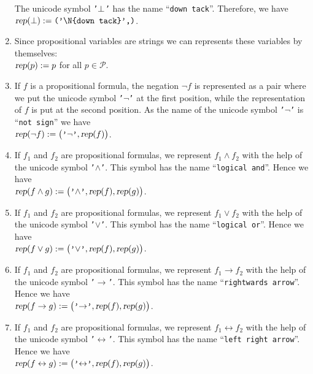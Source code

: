 \begin{enumerate}
      The unicode symbol \texttt{'$\bot$'} has the name ``\texttt{down tack}''.
      Therefore, we have
      \\[0.2cm]
      \hspace*{1.3cm}
      $\textsl{rep}(\falsum) := \texttt{('\symbol{92}N\{down tack\}',)}$.
\item Since propositional variables are strings we can represents these variables by themselves:
      \\[0.2cm]
      \hspace*{1.3cm}
      $\textsl{rep}(p) := p$ \quad for all $p \in \mathcal{P}$.
\item If $f$ is a propositional formula, the  negation $\neg f$ is represented as a pair where
      we put the unicode symbol \texttt{'$\neg$'} at the first position, while the representation of $f$ is put
      at the second position.  As the name of the unicode symbol \texttt{'$\neg$'} is
      ``\texttt{not sign}'' we have
      \\[0.2cm]
      \hspace*{1.3cm} 
      $\textsl{rep}(\neg f) := \bigl(\texttt{'$\neg$'}, \textsl{rep}(f)\bigr)$.
\item If $f_1$ and $f_2$ are propositional formulas, we represent $f_1 \wedge f_2$ with the help of the
      unicode symbol \texttt{'$\wedge$'}.  This symbol has the name ``\texttt{logical and}''.  Hence we have
      \\[0.2cm]
      \hspace*{1.3cm} 
      $\textsl{rep}(f \wedge g) := \bigl(\texttt{'$\wedge$'}, \textsl{rep}(f), \textsl{rep}(g)\bigr)$.
\item If $f_1$ and $f_2$ are propositional formulas, we represent $f_1 \vee f_2$ with the help of the unicode symbol
      \texttt{'$\vee$'}. This symbol has the name ``\texttt{logical or}''.  Hence we have
      \\[0.2cm]
      \hspace*{1.3cm} 
      $\textsl{rep}(f \vee g) := \bigl(\texttt{'$\vee$'}, \textsl{rep}(f), \textsl{rep}(g)\bigr)$.
\item If $f_1$ and $f_2$ are propositional formulas, we represent $f_1 \rightarrow f_2$ with the help of the
      unicode symbol \texttt{'$\rightarrow$'}.  This symbol has the name ``\texttt{rightwards arrow}''.
      Hence we have
      \\[0.2cm]
      \hspace*{1.3cm} 
      $\textsl{rep}(f \rightarrow g) := \bigl(\texttt{'$\rightarrow$'}, \textsl{rep}(f), \textsl{rep}(g)\bigr)$.
\item If $f_1$ and $f_2$ are propositional formulas, we represent $f_1 \leftrightarrow f_2$ with the help of
      the unicode symbol \texttt{'$\leftrightarrow$'}.  This symbol has the name ``\texttt{left right arrow}''.
      Hence we have
      \\[0.2cm]
      \hspace*{1.3cm} 
      $\textsl{rep}(f \leftrightarrow g) := \bigl(\texttt{'$\leftrightarrow$'}, \textsl{rep}(f), \textsl{rep}(g)\bigr)$.
\end{enumerate}
